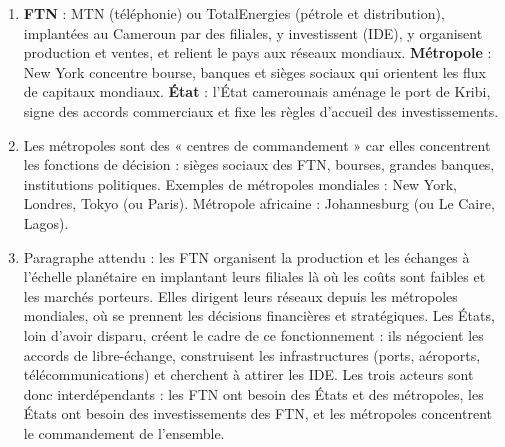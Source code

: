 \documentclass[11pt]{article}
\begin{document}
\begin{corrige}
\begin{enumerate}
\item \textbf{FTN} : MTN (téléphonie) ou TotalEnergies (pétrole et distribution), implantées au Cameroun par des filiales, y investissent (IDE), y organisent production et ventes, et relient le pays aux réseaux mondiaux. \textbf{Métropole} : New York concentre bourse, banques et sièges sociaux qui orientent les flux de capitaux mondiaux. \textbf{État} : l'État camerounais aménage le port de Kribi, signe des accords commerciaux et fixe les règles d'accueil des investissements.
\item Les métropoles sont des « centres de commandement » car elles concentrent les fonctions de décision : sièges sociaux des FTN, bourses, grandes banques, institutions politiques. Exemples de métropoles mondiales : New York, Londres, Tokyo (ou Paris). Métropole africaine : Johannesburg (ou Le Caire, Lagos).
\item Paragraphe attendu : les FTN organisent la production et les échanges à l'échelle planétaire en implantant leurs filiales là où les coûts sont faibles et les marchés porteurs. Elles dirigent leurs réseaux depuis les métropoles mondiales, où se prennent les décisions financières et stratégiques. Les États, loin d'avoir disparu, créent le cadre de ce fonctionnement : ils négocient les accords de libre-échange, construisent les infrastructures (ports, aéroports, télécommunications) et cherchent à attirer les IDE. Les trois acteurs sont donc interdépendants : les FTN ont besoin des États et des métropoles, les États ont besoin des investissements des FTN, et les métropoles concentrent le commandement de l'ensemble.
\end{enumerate}
\end{corrige}
\end{document}
